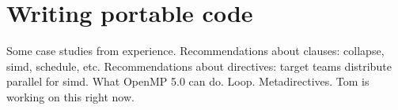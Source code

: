 

\chapter{Writing portable code}
Some case studies from experience.
Recommendations about clauses: collapse, simd, schedule, etc.
Recommendations about directives: target teams distribute parallel for simd.
What OpenMP 5.0 can do. Loop. Metadirectives. Tom is working on this right now.
